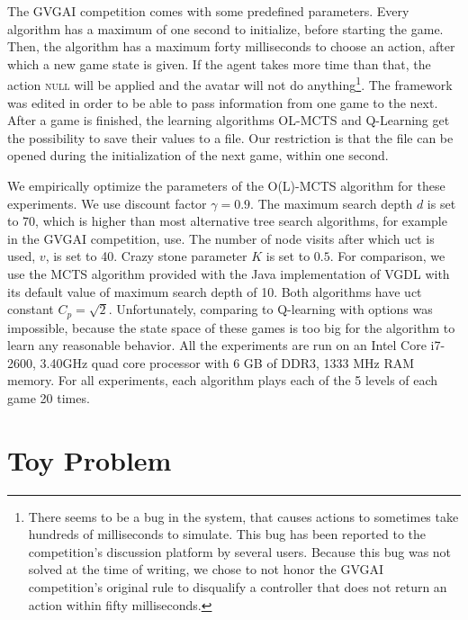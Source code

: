 The GVGAI competition comes with some predefined parameters. Every algorithm has
a maximum of one second to initialize, before starting the game. Then, the
algorithm has a maximum forty milliseconds to choose an action, after which a
new game state is given. If the agent takes more time than that, the action
\textsc{null} will be applied and the avatar will not do anything\footnote{There
seems to be a bug in the system, that causes actions to sometimes take hundreds
of milliseconds to simulate. This bug has been reported to the competition's
discussion platform by several users. Because this bug was not solved at the
time of writing, we chose to not honor the GVGAI competition's original rule to
disqualify a controller that does not return an action within fifty
milliseconds.}. The framework was edited in order to be able to pass information
from one game to the next. After a game is finished, the learning algorithms
OL-MCTS and Q-Learning get the possibility to save their values to a file. Our
restriction is that the file can be opened during the initialization of the next
game, within one second. 

We empirically optimize the parameters of the O(L)-MCTS algorithm for these
experiments. We use discount factor $\gamma = 0.9$. The maximum search depth $d$
is set to 70, which is higher than most alternative tree search algorithms, for
example in the GVGAI competition, use. The number of node visits after which
\textsf{uct} is used, $v$, is set to 40. Crazy stone parameter $K$ is set to
$0.5$.  For comparison, we use the MCTS algorithm provided with the Java
implementation of VGDL with its default value of maximum search depth of 10.
Both algorithms have \textsf{uct} constant $C_p = \sqrt{2}$. Unfortunately,
comparing to Q-learning with options was impossible, because the state space of
these games is too big for the algorithm to learn any reasonable behavior. All
the experiments are run on an Intel %
Core %
i7-2600, 3.40GHz quad core processor with 6 GB of DDR3, 1333 MHz RAM memory. For
all experiments, each algorithm plays each of the 5 levels of each game 20
times. 

\section{Toy Problem}






